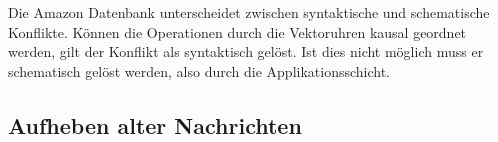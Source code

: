 Die Amazon Datenbank unterscheidet zwischen syntaktische und schematische Konflikte.
Können die Operationen durch die Vektoruhren kausal geordnet werden, gilt der Konflikt als syntaktisch gelöst.
Ist dies nicht möglich muss er schematisch gelöst werden, also durch die Applikationsschicht.


\subsection{Aufheben alter Nachrichten}

